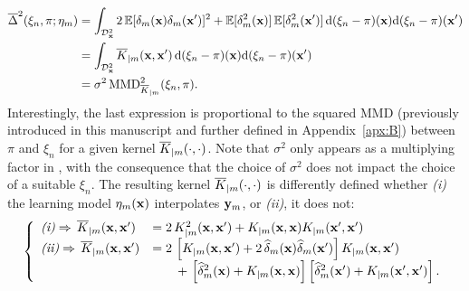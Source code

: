 \begin{subequations}
    \begin{align}
        \overline{\Delta}^2(\xi_n,\pi;\eta_m)&= \int_{\mathcal{D}_{\bf x}^2} 2 \, \mathbb{E}[\delta_m({\bf x})\delta_m({\bf x}')]^2 + \mathbb{E}[\delta_m^2({\bf x})] \, \mathbb{E}[\delta_m^2({\bf x}')] \,\mathrm{d}(\xi_n-\pi)({\bf x})\mathrm{d}(\xi_n-\pi)({\bf x}') \\
                                             &= \int_{\mathcal{D}_{\bf x}^2} \overline{K}_{|m}({\bf x}, {\bf x}')\,\mathrm{d}(\xi_n-\pi)({\bf x})\mathrm{d}(\xi_n-\pi)({\bf x}') \\
                                             &= \sigma^2\, \mathrm{MMD}_{\overline{K}_{|m}}^2(\xi_n,\pi).\label{eq:c5_variance}
    \end{align}
\end{subequations}
Interestingly, the last expression is proportional to the squared MMD (previously introduced in this manuscript and further defined in Appendix~\ref{apx:B}) between $\pi$ and $\xi_n$ for a given kernel $\overline{K}_{|m}(\cdot, \cdot)$. 
Note that $\sigma^2$ only appears as a multiplying factor in , with the consequence that the choice of $\sigma^2$ does not impact the choice of a suitable $\xi_n$.
The resulting kernel $\overline{K}_{|m}(\cdot, \cdot)$ is differently defined whether \textit{(i)} the learning model $\eta_m({\bf x})$ interpolates ${\bf y}_m$, or \textit{(ii)}, it does not: 
\begin{align}
    \left\{
    \begin{array}{ll}
        \textit{(i)}  \Rightarrow  \, \overline{K}_{|m}({\bf x},{\bf x}')&= 2\, K_{|m}^2({\bf x},{\bf x}') + K_{|m}({\bf x},{\bf x}) K_{|m}({\bf x}',{\bf x}')\\
        \textit{(ii)} \Rightarrow  \, \overline{K}_{|m}({\bf x},{\bf x}')&= 2\, \left[K_{|m}({\bf x},{\bf x}') + 2\,\widehat\delta_m({\bf x})\widehat\delta_m({\bf x}')\right]K_{|m}({\bf x},{\bf x}') \\
                                                        & \qquad +\,\left[\widehat\delta_m^2({\bf x})+K_{|m}({\bf x},{\bf x})\right]\left[\widehat\delta_m^2({\bf x}')+K_{|m}({\bf x}',{\bf x}')\right]. 
        \label{Eq:Kbarbar}
    \end{array}
\right.
\end{align}


